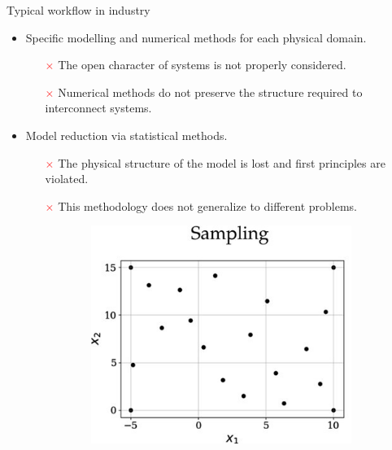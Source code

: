 \documentclass[aspectratio=169]{beamer}
\begin{document}
\begin{frame}{Typical workflow in industry}
	
	\begin{itemize}
		\item Specific modelling and numerical methods for each physical domain. 
			\begin{itemize}
			\item[\textcolor{red}{$\times$}] The open character of systems is not properly considered.
			\item[\textcolor{red}{$\times$}] Numerical methods do not preserve the structure required to interconnect systems.
		\end{itemize}
		\item Model reduction via statistical methods.
	\begin{itemize}
		\item[\textcolor{red}{$\times$}] The physical structure of the model is lost and first principles are violated.
		\item[\textcolor{red}{$\times$}] This methodology does not generalize to different problems.
	\end{itemize}
\vspace{.3cm}
	\begin{figure}[t]
		\centering
		\begin{subfigure}[t]{0.4\textwidth}
			\includegraphics[width=.8\columnwidth]{sampling.jpg}
		\end{subfigure}\hspace{1cm}
		\begin{subfigure}[t]{0.4\textwidth}

\end{subfigure}
\end{figure}
\end{itemize}
\end{frame}
\end{document}
